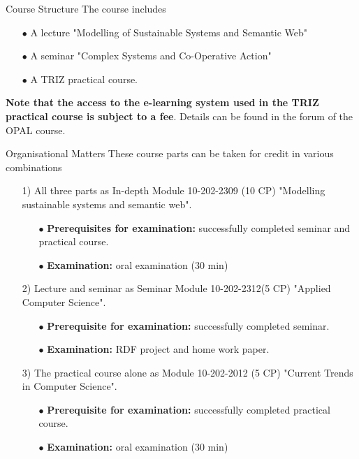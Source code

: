 \documentclass{beamer}
\begin{document}
\begin{frame}{Course Structure}
The course includes

\begin{itemize}
\item[$\bullet$] A lecture "Modelling of Sustainable Systems and Semantic Web"
\item[$\bullet$] A seminar "Complex Systems and Co-Operative Action"
\item[$\bullet$] A TRIZ practical course.
\end{itemize}
\textbf{Note that the access to the e-learning system used in the TRIZ
  practical course is subject to a fee}. Details can be found in the forum of
the OPAL course.
\end{frame}

\begin{frame}{Organisational Matters}
These course parts can be taken for credit in various combinations
\small
\begin{itemize}
\item[1)] All three parts as In-depth Module 10-202-2309 (10 CP) "Modelling
  sustainable systems and semantic web".
  \begin{itemize}[noitemsep]
  \item[$\bullet$] \textbf{Prerequisites for examination:} successfully
    completed seminar and practical course.
  \item[$\bullet$] \textbf{Examination:} oral examination (30 min)
  \end{itemize}
\item[2)] Lecture and seminar as Seminar Module 10-202-2312(5 CP) "Applied
  Computer Science".
  \begin{itemize}[noitemsep]
  \item[$\bullet$] \textbf{Prerequisite for examination:} successfully
    completed seminar.
  \item[$\bullet$] \textbf{Examination:} RDF project and home work paper.
  \end{itemize}
\item[3)] The practical course alone as Module 10-202-2012 (5 CP) "Current
  Trends in Computer Science".
  \begin{itemize}[noitemsep]
  \item[$\bullet$] \textbf{Prerequisite for examination:} successfully
    completed practical course.
  \item[$\bullet$] \textbf{Examination:} oral examination (30 min)
  \end{itemize}
\end{itemize}
\end{frame}
\end{document}
